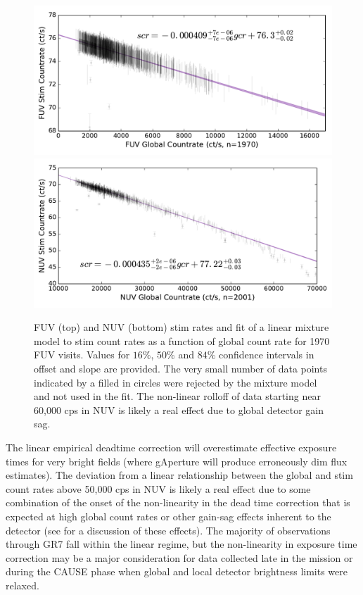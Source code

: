 \documentclass[preprint]{aastex}
\begin{document}
\clearpage
\begin{figure}[h]
\includegraphics[scale=0.75]{Fig10a.pdf}\\
\includegraphics[scale=0.75]{Fig10b.pdf}
\caption{FUV (top) and NUV (bottom) stim rates and fit of a linear mixture model to stim count rates as a function of global count rate for 1970 FUV visits. Values for $16\%$, $50\%$ and $84\%$ confidence intervals in offset and slope are provided. The very small number of data points indicated by a filled in circles were rejected by the mixture model and not used in the fit. The non-linear rolloff of data starting near 60,000 cps in NUV is likely a real effect due to global detector gain sag.
\label{stim}}
\end{figure}
\clearpage

The linear empirical deadtime correction will overestimate effective exposure times for very bright fields (where gAperture will produce erroneously dim flux estimates). The deviation from a linear relationship between the global and stim count rates above 50,000 cps in NUV is likely a real effect due to some combination of the onset of the non-linearity in the dead time correction that is expected at high global count rates or other gain-sag effects inherent to the detector (see \citep{mor2007} for a discussion of these effects). The majority of observations through GR7 fall within the linear regime, but the non-linearity in exposure time correction may be a major consideration for data collected late in the mission or during the CAUSE phase when global and local detector brightness limits were relaxed.
\end{document}
